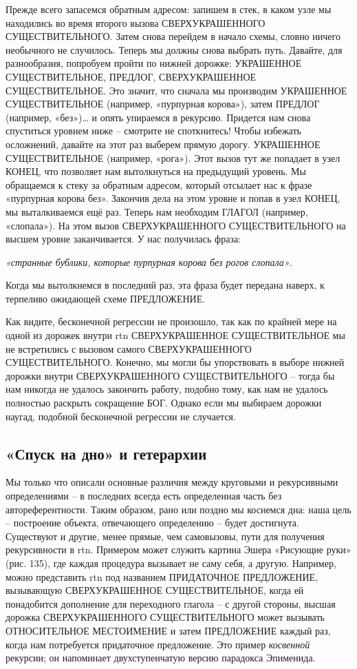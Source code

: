\documentclass[../main.tex]{subfiles}
\begin{document}
Прежде всего запасемся обратным адресом: запишем в стек, в каком узле мы находились во время второго вызова СВЕРХУКРАШЕННОГО СУЩЕСТВИТЕЛЬНОГО\@. Затем снова перейдем в начало схемы, словно ничего необычного не случилось. Теперь мы должны снова выбрать путь. Давайте, для разнообразия, попробуем пройти по нижней дорожке: УКРАШЕННОЕ СУЩЕСТВИТЕЛЬНОЕ, ПРЕДЛОГ, СВЕРХУКРАШЕННОЕ СУЩЕСТВИТЕЛЬНОЕ\@. Это значит, что сначала мы производим УКРАШЕННОЕ СУЩЕСТВИТЕЛЬНОЕ (например, «пурпурная корова»), затем ПРЕДЛОГ (например, «без»)\ldots{} и опять упираемся в рекурсию. Придется нам снова спуститься уровнем ниже \--- смотрите не споткнитесь! Чтобы избежать осложнений, давайте на этот раз выберем прямую дорогу. УКРАШЕННОЕ СУЩЕСТВИТЕЛЬНОЕ (например, «рога»). Этот вызов тут же попадает в узел КОНЕЦ, что позволяет нам вытолкнуться на предыдущий уровень. Мы обращаемся к стеку за обратным адресом, который отсылает нас к фразе «пурпурная корова без». Закончив дела на этом уровне и попав в узел КОНЕЦ, мы выталкиваемся ещё раз. Теперь нам необходим ГЛАГОЛ (например, «слопала»). На этом вызов СВЕРХУКРАШЕННОГО СУЩЕСТВИТЕЛЬНОГО на высшем уровне заканчивается. У нас получилась фраза:

\emph{«странные бублики, которые пурпурная корова без рогов слопала»}.

Когда мы вытолкнемся в последний раз, эта фраза будет передана наверх, к терпеливо ожидающей схеме ПРЕДЛОЖЕНИЕ\@.

Как видите, бесконечной регрессии не произошло, так как по крайней мере на одной из дорожек внутри \acs{rtn} СВЕРХУКРАШЕННОЕ СУЩЕСТВИТЕЛЬНОЕ мы не встретились с вызовом самого СВЕРХУКРАШЕННОГО СУЩЕСТВИТЕЛЬНОГО\@. Конечно, мы могли бы упорствовать в выборе нижней дорожки внутри СВЕРХУКРАШЕННОГО СУЩЕСТВИТЕЛЬНОГО \--- тогда бы нам никогда не удалось закончить работу, подобно тому, как нам не удалось полностью раскрыть сокращение БОГ\@. Однако если мы выбираем дорожки наугад, подобной бесконечной регрессии не случается.


\subsection{«Спуск на дно» и гетерархии}

Мы только что описали основные различия между круговыми и рекурсивными определениями \--- в последних всегда есть определенная часть без автореферентности. Таким образом, рано или поздно мы коснемся дна: наша цель \--- построение объекта, отвечающего определению \--- будет достигнута. Существуют и другие, менее прямые, чем самовызовы, пути для получения рекурсивности в \acs{rtn}\@. Примером может служить картина Эшера «Рисующие руки» (рис. 135), где каждая процедура вызывает не саму себя, а другую. Например, можно представить \acs{rtn} под названием ПРИДАТОЧНОЕ ПРЕДЛОЖЕНИЕ, вызывающую СВЕРХУКРАШЕННОЕ СУЩЕСТВИТЕЛЬНОЕ, когда ей понадобится дополнение для переходного глагола \--- с другой стороны, высшая дорожка СВЕРХУКРАШЕННОГО СУЩЕСТВИТЕЛЬНОГО может вызывать ОТНОСИТЕЛЬНОЕ МЕСТОИМЕНИЕ и затем ПРЕДЛОЖЕНИЕ каждый раз, когда нам потребуется придаточное предложение. Это пример \emph{косвенной} рекурсии; он напоминает двухступенчатую версию парадокса Эпименида.
\end{document}
